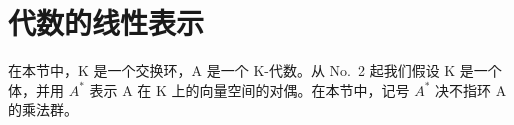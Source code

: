 \section{代数的线性表示}

在本节中，K 是一个交换环，A 是一个 K-代数。从 No.~2 起我们假设 K 是一个体，并用 \(A^{*}\) 表示 A 在 K 上的向量空间的对偶。在本节中，记号 \(A^{*}\) 决不指环 A 的乘法群。

